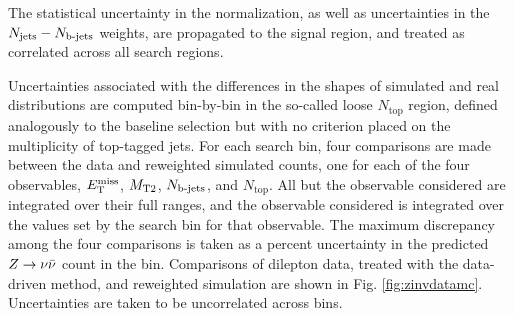 The statistical uncertainty in the normalization, as well as uncertainties in the $N_{\rm jets}-N_{\text{b-jets}}$ weights, are propagated to the signal region, and treated as correlated across all search regions.

Uncertainties associated with the differences in the shapes of simulated and real distributions are computed bin-by-bin in the so-called loose $N_{\text{top}}$ region, defined analogously to the baseline selection but with no criterion placed on the multiplicity of top-tagged jets. For each search bin, four comparisons are made between the data and reweighted simulated counts, one for each of the four observables, $E_{\text{T}}^{\rm miss}$, $M_{\text{T}2}$, $N_{\text{b-jets}}$, and $N_{\text{top}}$. All but the observable considered are integrated over their full ranges, and the observable considered is integrated over the values set by the search bin for that observable. The maximum discrepancy among the four comparisons is taken as a percent uncertainty in the predicted $Z\rightarrow \nu\bar{\nu}$ count in the bin. Comparisons of dilepton data, treated with the data-driven method, and reweighted simulation are shown in Fig. \ref{fig:zinvdatamc}. Uncertainties are taken to be uncorrelated across bins.


